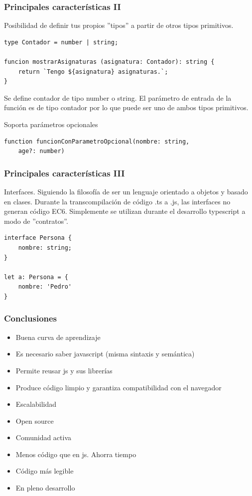 \documentclass{beamer}
\begin{document}
\begin{frame}[fragile]
\frametitle{Principales características II}
Posibilidad de definir tus propios ''tipos'' a partir de otros tipos primitivos. 
\small
\begin{lstlisting}[style=customc, frame=single]
type Contador = number | string;

funcion mostrarAsignaturas (asignatura: Contador): string {
	return `Tengo ${asignatura} asignaturas.`;
}
\end{lstlisting}
Se define contador de tipo number o string. El parámetro de entrada de la función es de tipo contador
por lo que puede ser uno de ambos tipos primitivos. 

Soporta parámetros opcionales

\begin{lstlisting}[style=customc, frame=single]
function funcionConParametroOpcional(nombre: string, 
	age?: number)
\end{lstlisting}

\end{frame}

\begin{frame}[fragile]
\frametitle{Principales características III}
Interfaces. Siguiendo la filosofía de ser un lenguaje orientado a objetos y basado en clases.
Durante la transcompilación de código .ts a .js, las interfaces no generan código EC6. 
Simplemente se utilizan durante el desarrollo typescript a modo de ''contratos''.
\begin{lstlisting}[style=customc, frame=single]
interface Persona {
	nombre: string;
}

let a: Persona = {
	nombre: 'Pedro'
}
\end{lstlisting}
\end{frame}

\begin{frame}
\frametitle{Conclusiones}
	\begin{itemize}
		\item Buena curva de aprendizaje 
		\item Es necesario saber javascript (misma sintaxis y semántica)
		\item Permite reusar js y sus librerías
		\item Produce código limpio y garantiza compatibilidad con el navegador
		\item Escalabilidad
		\item Open source
		\item Comunidad activa
		\item Menos código que en js. Ahorra tiempo
		\item Código más legible
		\item En pleno desarrollo
		
	\end{itemize}
\end{frame}
\end{document}
